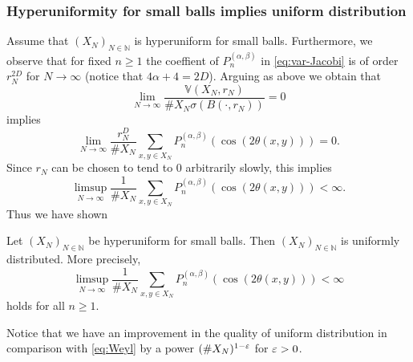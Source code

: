 \subsubsection{Hyperuniformity for small balls implies uniform
  distribution}\label{sec:hyper-small-balls}
Assume that $(X_N)_{N\in\mathbb{N}}$ is hyperuniform for small
balls. Furthermore, we observe that for fixed $n\geq1$ the coeffient of
$P_n^{(\alpha,\beta)}$ in \eqref{eq:var-Jacobi} is of order $r_N^{2D}$ for
$N\to\infty$ (notice that $4\alpha+4=2D$). Arguing as above we obtain that
\begin{equation*}
  \lim_{N\to\infty}\frac{\mathbb{V}(X_N,r_N)}{\#X_N\sigma(B(\cdot,r_N))}=0
\end{equation*}
implies
\begin{equation*}
  \lim_{N\to\infty}\frac{r_N^D}{\#X_N}
  \sum_{x,y\in X_N}P_n^{(\alpha,\beta)}(\cos(2\theta(x,y)))=0.
\end{equation*}
Since $r_N$ can be chosen to tend to $0$ arbitrarily slowly, this implies
\begin{equation*}
  \limsup_{N\to\infty}\frac{1}{\#X_N}
  \sum_{x,y\in X_N}P_n^{(\alpha,\beta)}(\cos(2\theta(x,y)))<\infty.
\end{equation*}
Thus we have shown
\begin{theorem}\label{thm:small}
  Let $(X_N)_{N\in\mathbb{N}}$ be hyperuniform for small balls. Then
  $(X_N)_{N\in\mathbb{N}}$ is uniformly distributed. More precisely,
  \begin{equation}\label{eq:Weyl-better2}
    \limsup_{N\to\infty}\frac1{\#X_N}
  \sum_{x,y\in X_N}P_n^{(\alpha,\beta)}(\cos(2\theta(x,y)))<\infty
\end{equation}
holds for all $n\geq1$.
\end{theorem}
\begin{remark}
  Notice that we have an improvement in the quality of uniform distribution in
  comparison with \eqref{eq:Weyl} by a power $(\#X_N)^{1-\varepsilon}$ for $\varepsilon>0$.
\end{remark}
